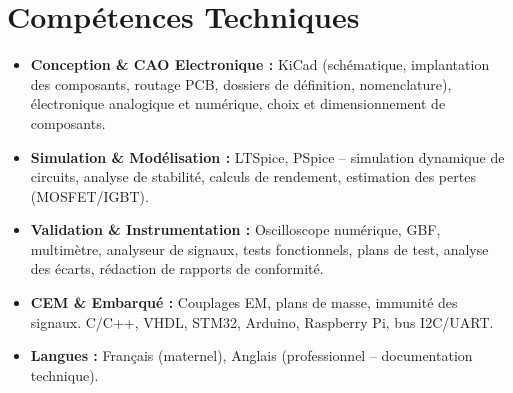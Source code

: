 \documentclass[a4paper,11pt]{article}
\begin{document}
\vspace{1pt}

\section{Compétences Techniques}
\begin{itemize}[leftmargin=*, nosep]
    \item \small{\textbf{Conception \& CAO Electronique :} KiCad (schématique, implantation des composants, routage PCB, dossiers de définition, nomenclature), électronique analogique et numérique, choix et dimensionnement de composants.}
    \item \small{\textbf{Simulation \& Modélisation :} LTSpice, PSpice -- simulation dynamique de circuits, analyse de stabilité, calculs de rendement, estimation des pertes (MOSFET/IGBT).}
    \item \small{\textbf{Validation \& Instrumentation :} Oscilloscope numérique, GBF, multimètre, analyseur de signaux, tests fonctionnels, plans de test, analyse des écarts, rédaction de rapports de conformité.}
    \item \small{\textbf{CEM \& Embarqué :} Couplages EM, plans de masse, immunité des signaux. C/C++, VHDL, STM32, Arduino, Raspberry Pi, bus I2C/UART.}
    \item \small{\textbf{Langues :} Français (maternel), Anglais (professionnel -- documentation technique).}
\end{itemize}

\vspace{1pt}

\end{document}
